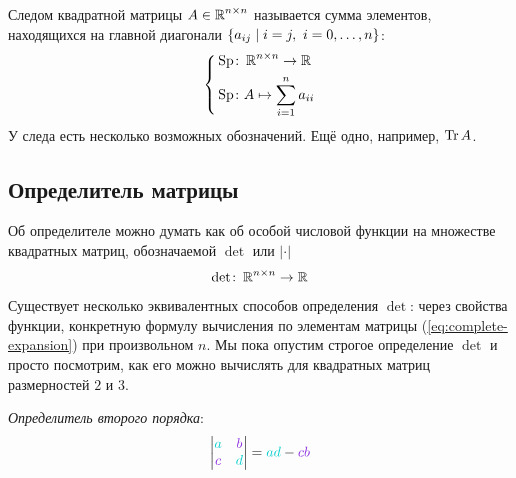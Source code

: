 \documentclass[a4paper,12pt]{article}
\begin{document}
  \begin{definition}
    Следом квадратной матрицы $A \in \operatorname{\mathbb R}^{n \times n}$ называется сумма элементов, находящихся на главной диагонали $\{a_{ij} \hm\mid i = j,\ i = 0, \ldots, n\}$:
    \[
      \left\{
        \begin{aligned}
          &\operatorname{Sp} \colon \operatorname{\mathbb R}^{n \times n} \to \operatorname{\mathbb R}\\
          &\operatorname{Sp} \colon A \mapsto \sum_{i = 1}^n a_{ii}
        \end{aligned}
      \right.
    \]
    У следа есть несколько возможных обозначений.
    Ещё одно, например, $\operatorname{Tr} A$.
  \end{definition}


  \subsection{Определитель матрицы}
  
  Об определителе можно думать как об особой числовой функции на множестве квадратных матриц, обозначаемой $\det$ или $|\cdot|$
  \[
    \det \colon \operatorname{\mathbb R}^{n\times n} \to \operatorname{\mathbb R}
  \]
  Существует несколько эквивалентных способов определения $\det$: через свойства функции, конкретную формулу вычисления по элементам матрицы (\ref{eq:complete-expansion}) при произвольном $n$.
  Мы пока опустим строгое определение $\det$ и просто посмотрим, как его можно вычислять для квадратных матриц размерностей $2$ и $3$.
  
  \emph{Определитель второго порядка}:
  \[
    \begin{vmatrix}
      \textcolor{light-cyan}{a}   & \textcolor{light-purple}{b} \\
      \textcolor{light-purple}{c} & \textcolor{light-cyan}{d} 
    \end{vmatrix} = \textcolor{light-cyan}{a} \textcolor{light-cyan}{d}  - \textcolor{light-purple}{c} \textcolor{light-purple}{b}
  \]
\end{document}
